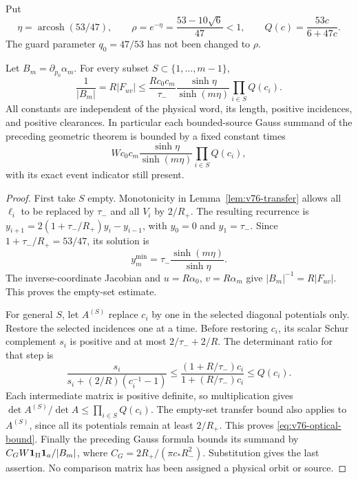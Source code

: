 Put
\begin{equation}\label{eq:v76-optical-rate}
 \eta=\operatorname{arcosh}(53/47),\qquad
 \rho=e^{-\eta}=\frac{53-10\sqrt6}{47}<1,
 \qquad Q(c)=\frac{53c}{6+47c}.
\end{equation}
The guard parameter $q_0=47/53$ has not been changed to $\rho$.

\begin{theorem}
\label{thm:v76-optical-weight}
Let $B_m=\partial_{p_0}\alpha_m$. For every subset
$S\subset\{1,\ldots,m-1\}$,
\begin{equation}\label{eq:v76-optical-bound}
 \frac1{|B_m|}=R|F_{uv}|
 \le\frac{R c_0c_m}{\tau_-}
       \frac{\sinh\eta}{\sinh(m\eta)}\prod_{i\in S}Q(c_i).
\end{equation}
All constants are independent of the physical word, its length,
positive incidences, and positive clearances. In particular each
bounded-source Gauss summand of the preceding geometric theorem
is bounded by a fixed constant times
\[
 Wc_0c_m\frac{\sinh\eta}{\sinh(m\eta)}\prod_{i\in S}Q(c_i),
\]
with its exact event indicator still present.
\end{theorem}
\begin{proof}
First take $S$ empty. Monotonicity in Lemma~\ref{lem:v76-transfer}
allows all $\ell_i$ to be replaced by $\tau_-$ and all $V_i$ by
$2/R_+$. The resulting recurrence is
$y_{i+1}=2(1+\tau_-/R_+)y_i-y_{i-1}$, with $y_0=0$ and
$y_1=\tau_-$. Since $1+\tau_-/R_+=53/47$, its solution is
\[
 y_m^{\min}=\tau_-\frac{\sinh(m\eta)}{\sinh\eta}.
\]
The inverse-coordinate Jacobian and $u=R\alpha_0$, $v=R\alpha_m$
give $|B_m|^{-1}=R|F_{uv}|$. This proves the empty-set estimate.

For general $S$, let $A^{(S)}$ replace $c_i$ by one in the selected
diagonal potentials only. Restore the selected incidences one at
a time. Before restoring $c_i$, its scalar Schur complement $s_i$
is positive and at most $2/\tau_-+2/R$. The determinant ratio for
that step is
\[
 \frac{s_i}{s_i+(2/R)(c_i^{-1}-1)}
 \le\frac{(1+R/\tau_-)c_i}{1+(R/\tau_-)c_i}
 \le Q(c_i).
\]
Each intermediate matrix is positive definite, so multiplication
gives $\det A^{(S)}/\det A\le\prod_{i\in S}Q(c_i)$.
The empty-set transfer bound also applies to $A^{(S)}$, since all
its potentials remain at least $2/R_+$. This proves
\eqref{eq:v76-optical-bound}. Finally the preceding Gauss formula
bounds its summand by
$C_GW\mathbf1_\Pi\mathbf1_a/|B_m|$, where
$C_G=2R_+/(\pi c_*R_-^2)$. Substitution gives the last assertion.
No comparison matrix has been assigned a physical orbit or source.
\end{proof}

